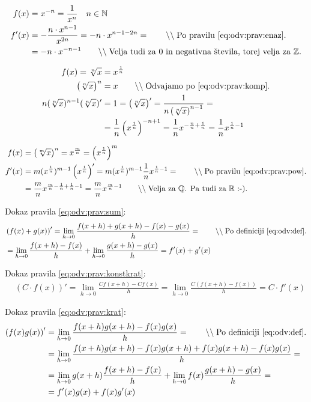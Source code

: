 \documentclass[a4paper,oneside,12pt,fleqn]{article}
\def\R{\ensuremath{\mathbb R}}
\def\N{\ensuremath{\mathbb N}}
\def\Z{\ensuremath{\mathbb Z}}
\def\Q{\ensuremath{\mathbb Q}}
\newcommand\krat\cdot
\newcommand{\comment}[1]{\ensuremath{\qquad\backslash\backslash\;}\textnormal{#1}}
\def\limh{\lim_{h\rightarrow0}} %
\numberwithin{equation}{section}
\begin{document}
\begin{align*}
  f(x) &= x^{-n} = \frac{1}{x^n}  \quad n \in \N \\
  f'(x) &= -\frac{n\krat x^{n-1}}{x^{2n}} = -n\krat x^{n-1-2n} = \comment{Po pravilu \eqref{eq:odv:prav:enaz}.} \\
  &= -n\krat x^{-n-1} \comment{Velja tudi za 0 in negativna števila, torej velja za $\Z$.}
\end{align*}

\begin{align*}
   f(x) = \sqrt[n]{x} &= x^{\frac{1}{n}} \\
  \left( \sqrt[n]{x} \right)^n &= x \comment{Odvajamo po \eqref{eq:odv:prav:komp}.} \\
  n(\sqrt[n]{x})^{n-1}(\sqrt[n]{x})' &= 1 =  
  \left(\sqrt[n]{x}\right)' = \frac{1}{n\left(\sqrt[n]{x}\right)^{n-1}} =  \\
  & = \frac{1}{n}\left(x^{\frac{1}{n}}\right)^{-n+1} = \frac{1}{n}x^{-\frac{n}{n} +
  \frac{1}{n}} = \frac{1}{n}x^{\frac{1}{n}-1}
\end{align*}

\begin{align*}
  f(x) &= \left( \sqrt[m]{x}\right)^n = x^{\frac{m}{n}} = \left(x^{\frac{1}{n}}\right)^m \\
  f'(x) &= m(x^{\frac{1}{n}})^{m-1}\left( x^{\frac{1}{n}} \right)' =
  m(x^{\frac{1}{n}})^{m-1}\frac{1}{n}x^{\frac{1}{n}-1} = \comment{Po pravilu
  \eqref{eq:odv:prav:pow}.} \\
  &= \frac{m}{n}x^{\frac{m}{n}-\frac{1}{n}+\frac{1}{n} - 1} = \frac{m}{n}x^{\frac{m}{n}-1}
  \comment{Velja za \Q. Pa tudi za \R\ :-).}
\end{align*}

Dokaz pravila \eqref{eq:odv:prav:sum}:
\begin{align*}
  &\left( f(x)+g(x) \right)' = \limh\frac{f(x+h)+g(x+h)-f(x)-g(x)}{h} = \comment{Po definiciji \eqref{eq:odv:def}.} \\
  &= \limh\frac{f(x+h)-f(x)}{h} + \limh\frac{g(x+h)-g(x)}{h} =
  f'(x)+g'(x)
\end{align*}

Dokaz pravila \eqref{eq:odv:prav:konstkrat}:
\begin{align*}
  & (C\krat f(x))' = \limh\frac{Cf(x+h)-Cf(x)}{h} = \limh\frac{C(f(x+h)-f(x))}{h} = C\krat f'(x)
\end{align*}

Dokaz pravila \eqref{eq:odv:prav:krat}:
\begin{align*}
  \left( f(x)g(x) \right)' &= \limh \frac{f(x+h)g(x+h)-f(x)g(x)}{h} = \comment{Po definiciji \eqref{eq:odv:def}.} \\
  &= \limh \frac{f(x+h)g(x+h) - f(x)g(x+h) + f(x)g(x+h) - f(x)g(x)}{h} = \\
  &= \limh g(x+h)\frac{f(x+h)-f(x)}{h} +
  \limh f(x)\frac{g(x+h)-g(x)}{h} = \\
  &= f'(x)g(x)+f(x)g'(x)
\end{align*}
\end{document}
